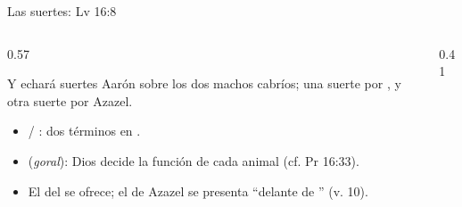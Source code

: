 \begin{frame}{Las suertes: Lv 16:8}
\begin{columns}[c,onlytextwidth]
\begin{column}{0.57\textwidth}
\begin{cita}Y echará suertes Aarón sobre los dos machos cabríos; una suerte por \SENOR, y otra suerte por Azazel.\end{cita}
\small
\begin{itemize}
\item {} / : dos términos en .
\item {} (\emph{goral}): Dios decide la función de cada animal (cf. Pr 16:33).
\item El del \SENOR{} se ofrece; el de Azazel se presenta  ``delante de \SENOR'' (v. 10).
\end{itemize}
\end{column}
\begin{column}{0.41\textwidth}\end{column}
\end{columns}
\end{frame}

